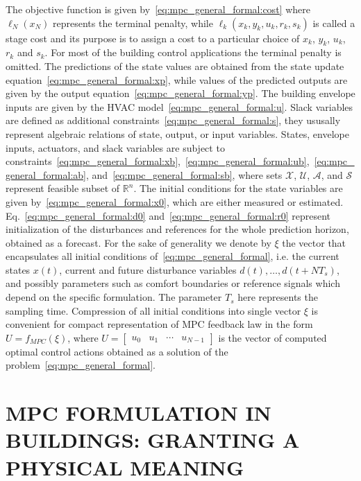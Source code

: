 \documentclass[10pt]{article}
\begin{document}
The objective function is given by~\eqref{eq:mpc_general_formal:cost} where   $\ell_N(x_N)$  represents the terminal penalty, while $\ell_k(x_k,y_k,u_k,r_k,s_k)$  is called a stage cost and its
purpose is to assign a cost to a particular choice of $x_k$, $y_k$, $u_k$, $r_k$ and $s_k$. For most of the building control applications the terminal penalty is omitted.
The predictions of the state values are obtained from the state update equation~\eqref{eq:mpc_general_formal:xp}, while values of the predicted outputs are given by the output equation~\eqref{eq:mpc_general_formal:yp}.
{\color{blue} 
The building envelope inputs are given by the HVAC model~\eqref{eq:mpc_general_formal:u}. }
Slack variables are defined as additional constraints~\eqref{eq:mpc_general_formal:s}, they ususally represent algebraic relations of state, output, or input variables.
% 
States, envelope inputs, actuators, and slack variables are subject to
constraints~\eqref{eq:mpc_general_formal:xb},~\eqref{eq:mpc_general_formal:ub},~\eqref{eq:mpc_general_formal:ab}, and~\eqref{eq:mpc_general_formal:sb},
where sets  $\mathcal{X}$, $\mathcal{U}$, $\mathcal{A}$, and $\mathcal{S}$ represent feasible subset of $\mathbb{R}^{n}$. 
% 
The initial conditions for the state variables are given by~\eqref{eq:mpc_general_formal:x0}, which are either  measured or estimated. 
Eq.~\eqref{eq:mpc_general_formal:d0} and~\eqref{eq:mpc_general_formal:r0} represent initialization of the disturbances and references  for the whole prediction horizon, obtained as a forecast.
% 
For the sake of generality we denote by $\xi$ the vector that encapsulates all initial conditions of~\eqref{eq:mpc_general_formal}, i.e. the current states $x(t)$, current and future disturbance variables $d(t), \ldots, d(t+N T_s)$, and possibly parameters such as comfort boundaries or reference signals which depend on the specific formulation.
The parameter $T_s$ here represents the sampling time.
Compression of all initial conditions into single vector $\xi$ is convenient for 
compact  representation of MPC feedback law in the form $U = f_{MPC}(\xi)$,
where $U = \begin{bmatrix} u_0 & u_1 & \cdots & u_{N-1} \end{bmatrix} $ is the vector of computed optimal control actions obtained as a solution of the problem~\eqref{eq:mpc_general_formal}.



\section{MPC FORMULATION IN BUILDINGS: GRANTING A PHYSICAL MEANING }
\end{document}
